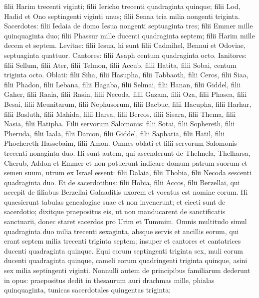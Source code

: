 \begin{biblechapter}
\begin{biblechapter}
\begin{biblechapter}
\begin{biblechapter}
\begin{biblechapter}
\begin{biblechapter}
\begin{biblechapter}
\verse filii Harim trecenti viginti; 
\verse filii Iericho trecenti quadraginta quinque; 
 \verse filii Lod, Hadid et Ono septingenti viginti unus; 
\verse filii Senaa tria milia nongenti triginta.
 \verse Sacerdotes: filii Iedaia de domo Iesua nongenti septuaginta tres; 
\verse filii Emmer mille quinquaginta duo; 
\verse filii Phassur mille ducenti quadraginta septem; 
\verse filii Harim mille decem et septem.
 \verse Levitae: filii Iesua, hi sunt filii Cadmihel, Bennui et Odoviae, septuaginta quattuor.
 \verse Cantores: filii Asaph centum quadraginta octo.
 \verse Ianitores: filii Sellum, filii Ater, filii Telmon, filii Accub, filii Hatita, filii Sobai, centum triginta octo.
 \verse Oblati: filii Siha, filii Hasupha, filii Tabbaoth, 
\verse filii Ceros, filii Siaa, filii Phadon, 
\verse filii Lebana, filii Hagaba, filii Selmai, 
\verse filii Hanan, filii Giddel, filii Gaher, 
\verse filii Raaia, filii Rasin, filii Necoda, 
\verse filii Gazam, filii Oza, filii Phasea, 
\verse filii Besai, filii Meunitarum, filii Nephusorum, 
\verse filii Bacbuc, filii Hacupha, filii Harhur, 
 \verse filii Basluth, filii Mahida, filii Harsa, 
\verse filii Bercos, filii Sisara, filii Thema, 
\verse filii Nasia, filii Hatipha.
 \verse Filii servorum Salomonis: filii Sotai, filii Sophereth, filii Pheruda, 
\verse filii Iaala, filii Darcon, filii Giddel, 
\verse filii Saphatia, filii Hatil, filii Phochereth Hassebaim, filii Amon.
 \verse Omnes oblati et filii servorum Salomonis trecenti nonaginta duo.
 \verse Hi sunt autem, qui ascenderunt de Thelmela, Thelharsa, Cherub, Addon et Emmer et non potuerunt indicare domum patrum suorum et semen suum, utrum ex Israel essent: 
\verse filii Dalaia, filii Thobia, filii Necoda sescenti quadraginta duo. 
\verse Et de sacerdotibus: filii Hobia, filii Accos, filii Berzellai, qui accepit de filiabus Berzellai Galaaditis uxorem et vocatus est nomine eorum. 
 \verse Hi quaesierunt tabulas genealogiae suae et non invenerunt; et eiecti sunt de sacerdotio; 
\verse dixitque praepositus eis, ut non manducarent de sanctificatis sanctuarii, donec staret sacerdos pro Urim et Tummim.
 \verse Omnis multitudo simul quadraginta duo milia trecenti sexaginta, 
\verse absque servis et ancillis eorum, qui erant septem milia trecenti triginta septem; insuper et cantores et cantatrices ducenti quadraginta quinque. 
\verse Equi eorum septingenti triginta sex, muli eorum ducenti quadraginta quinque, 
\verse cameli eorum quadringenti triginta quinque, asini sex milia septingenti viginti.
 \verse Nonnulli autem de principibus familiarum dederunt in opus: praepositus dedit in thesaurum auri drachmas mille, phialas quinquaginta, tunicas sacerdotales quingentas triginta; 

\end{biblechapter}
\end{biblechapter}
\end{biblechapter}
\end{biblechapter}
\end{biblechapter}
\end{biblechapter}
\end{biblechapter}
